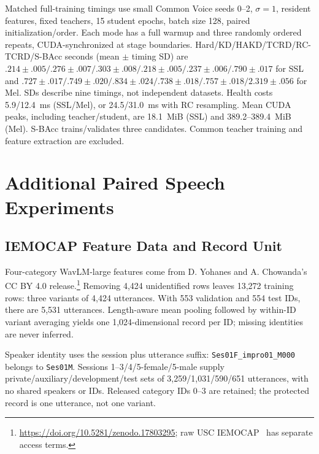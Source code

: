 \documentclass[journal]{IEEEtran}
\begin{document}
Matched full-training timings use small Common Voice seeds 0--2, $\sigma=1$, resident features, fixed teachers, 15 student epochs, batch size 128, paired initialization/order. Each mode has a full warmup and three randomly ordered repeats, CUDA-synchronized at stage boundaries. Hard/KD/HAKD/TCRD/RC-TCRD/S-BAcc seconds (mean $\pm$ timing SD) are $.214\pm.005/.276\pm.007/.303\pm.008/.218\pm.005/.237\pm.006/.790\pm.017$ for SSL and $.727\pm.017/.749\pm.020/.834\pm.024/.738\pm.018/.757\pm.018/2.319\pm.056$ for Mel. SDs describe nine timings, not independent datasets. Health costs 5.9/12.4~ms (SSL/Mel), or 24.5/31.0~ms with RC resampling. Mean CUDA peaks, including teacher/student, are 18.1~MiB (SSL) and 389.2--389.4~MiB (Mel). S-BAcc trains/validates three candidates. Common teacher training and feature extraction are excluded.

\section{Additional Paired Speech Experiments}
\subsection{IEMOCAP Feature Data and Record Unit}
Four-category WavLM-large features come from D. Yohanes and A. Chowanda's CC BY 4.0 release.\footnote{\url{https://doi.org/10.5281/zenodo.17803295}; raw USC IEMOCAP~\cite{busso2008iemocap} has separate access terms.} Removing 4,424 unidentified rows leaves 13,272 training rows: three variants of 4,424 utterances. With 553 validation and 554 test IDs, there are 5,531 utterances. Length-aware mean pooling followed by within-ID variant averaging yields one 1,024-dimensional record per ID; missing identities are never inferred.

Speaker identity uses the session plus utterance suffix: \texttt{Ses01F\_impro01\_M000} belongs to \texttt{Ses01M}. Sessions 1--3/4/5-female/5-male supply private/auxiliary/development/test sets of 3,259/1,031/590/651 utterances, with no shared speakers or IDs. Released category IDs 0--3 are retained; the protected record is one utterance, not one variant.
\end{document}
